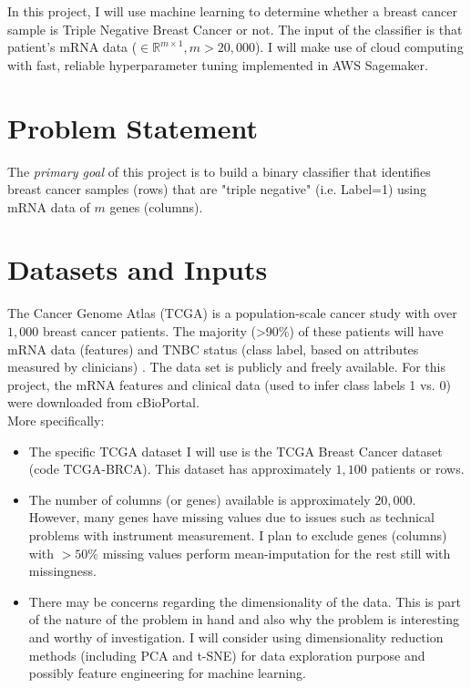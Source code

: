 \documentclass[11pt]{diazessay}
\begin{document}
In this project, I will use machine learning to determine whether a breast cancer sample is Triple Negative Breast Cancer or not. The input of the classifier is that patient's mRNA data ($\in \mathbb{R}^{m \times 1}, m > 20,000$).  I will make use of cloud computing with fast, reliable hyperparameter tuning implemented in AWS Sagemaker.

\section{Problem Statement}

The \textit{primary goal} of this project is to build a binary classifier that identifies breast cancer samples (rows) that are "triple negative" (i.e. Label=1) using mRNA data of $m$ genes (columns).

\section{Datasets and Inputs}

The Cancer Genome Atlas (TCGA) is a population-scale cancer study with  over $1,000$ breast cancer patients. The majority (>90\%) of these patients will have mRNA data (features) and TNBC status (class label, based on attributes measured by clinicians) \cite{tcga2012}. The data set is publicly and freely available. For this project, the mRNA features and clinical data (used to infer class labels 1 vs. 0)  were downloaded from cBioPortal. \\

More specifically:

\begin{itemize}
	\item The specific TCGA dataset I will use is the TCGA Breast Cancer dataset (code TCGA-BRCA). This dataset has approximately $1,100$ patients or rows.
	\item The number of columns (or genes) available is approximately $20,000$. However, many genes have missing values due to issues such as technical problems with instrument measurement. I plan to exclude genes (columns) with $>50\%$ missing values perform mean-imputation for the rest still with missingness.
	\item There may be concerns regarding the dimensionality of the data. This is part of the nature of the problem in hand and also why the problem is interesting and worthy of investigation. I will consider using dimensionality reduction methods (including PCA and t-SNE) for data exploration purpose and possibly feature engineering for machine learning.
\end{itemize}
\end{document}
